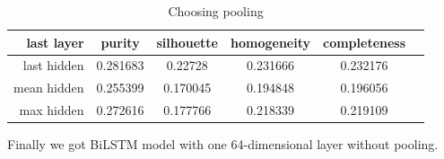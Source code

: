 \documentclass[11pt]{article}
\begin{document}
\begin{table}[htb]
\begin{center}
\begin{tabular}{ |r|c|c|c|c|c| }
\hline
last layer & purity  & silhouette  & homogeneity  & completeness \\ \hline 
last hidden & 0.281683  & 0.22728  & 0.231666  & 0.232176\\ \hline 
mean hidden & 0.255399 &	0.170045 	& 0.194848 	& 0.196056 \\ \hline
max hidden  &	0.272616 	& 0.177766 	& 0.218339 	& 0.219109 \\ \hline
\end{tabular}
\end{center}
\caption{Choosing pooling}
\end{table}
\FloatBarrier

Finally we got BiLSTM model with one 64-dimensional layer without pooling.
\end{document}

